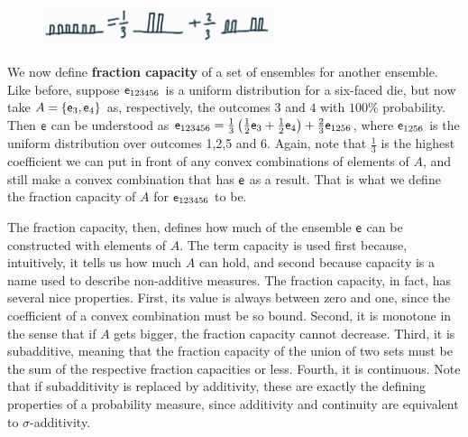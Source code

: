 \begin{figure}[h]
	\centering
	\includegraphics[width=0.6\textwidth]{tempimages/FractionCapacity.jpg}
\end{figure}

We now define \textbf{fraction capacity} of a set of ensembles for another ensemble. Like before, suppose $\mathsf{e}_{123456}$ is a uniform distribution for a six-faced die, but now take $A = \{ \mathsf{e}_3, \mathsf{e}_4 \}$ as, respectively, the outcomes $3$ and $4$ with $100\%$ probability. Then $\mathsf{e}$ can be understood as $\mathsf{e}_{123456} = \frac{1}{3} \left(\frac{1}{2} \mathsf{e}_3 + \frac{1}{2} \mathsf{e}_4 \right) + \frac{2}{3} \mathsf{e}_{1256}$, where $\mathsf{e}_{1256}$ is the uniform distribution over outcomes 1,2,5 and 6. Again, note that $\frac{1}{3}$ is the highest coefficient we can put in front of any convex combinations of elements of $A$, and still make a convex combination that has $\mathsf{e}$ as a result. That is what we define the fraction capacity of $A$ for $\mathsf{e}_{123456}$ to be.

The fraction capacity, then, defines how much of the ensemble $\mathsf{e}$ can be constructed with elements of $A$. The term capacity is used first because, intuitively, it tells us how much $A$ can hold, and second because capacity is a name used to describe non-additive measures. The fraction capacity, in fact, has several nice properties. First, its value is always between zero and one, since the coefficient of a convex combination must be so bound. Second, it is monotone in the sense that if $A$ gets bigger, the fraction capacity cannot decrease. Third, it is subadditive, meaning that the fraction capacity of the union of two sets must be the sum of the respective fraction capacities or less. Fourth, it is continuous. Note that if subadditivity is replaced by additivity, these are exactly the defining properties of a probability measure, since additivity and continuity are equivalent to $\sigma$-additivity.


